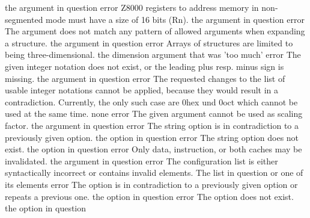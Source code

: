 \documentclass[12pt,twoside]{report}
\begin{document}
\begin{description}
               {the argument in question}
               {error}
               {Z8000 registers to address memory in non-segmented mode must have a size of 16 bits (Rn).}
               {the argument in question}
               {error}
               {The argument does not match any pattern of allowed arguments
                when expanding a structure.}
               {the argument in question}
               {error}
               {Arrays of structures are limited to being three-dimensional.}
               {the dimension argument that was 'too much'}
               {error}
               {The given integer notation does not exist, or the leading plus resp.
                minus sign is missing.}
               {the argument in question}
               {error}
               {The requested changes to the list of usable integer notations cannot
                be applied, because they would result in a contradiction.  Currently,
                the only such case are 0hex und 0oct which cannot be used at the same
                time.}
               {none}
               {error}
               {The given argument cannot be used as scaling factor.}
               {the argument in question}
               {error}
               {The string option is in contradiction to a previously given option.}
               {the option in question}
               {error}
               {The string option does not exist.}
               {the option in question}
               {error}
               {Only data, instruction, or both caches may be invalidated.}
               {the argument in question}
               {error}
               {The configuration list is either syntactically incorrect or
                contains invalid elements.}
               {The list in question or one of its elements}
               {error}
               {The option is in contradiction to a previously given option or repeats a previous one.}
               {the option in question}
               {error}
               {The option does not exist.}
               {the option in question}

\end{description}
\end{document}
